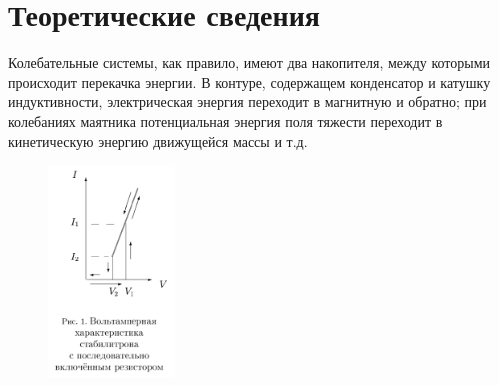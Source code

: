 \documentclass[a4paper, 12pt]{article}%
\begin{document}
\section{Теоретические сведения}

 Колебательные системы, как правило, имеют два накопителя, между которыми происходит перекачка энергии. В контуре, содержащем конденсатор и катушку индуктивности, электрическая энергия переходит в магнитную и обратно; при колебаниях маятника потенциальная энергия поля тяжести переходит в кинетическую энергию движущейся массы и т.д. 

\begin{figure} 
\begin{center}
\includegraphics[width=0.3\textwidth]{./ann/1.PNG} 
\end{center}
\end{figure}
\end{document}

